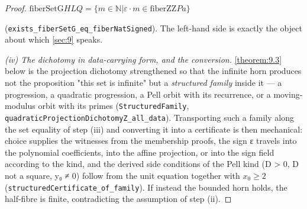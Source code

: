 \documentclass[11pt]{article}
\theoremstyle{plain}
\theoremstyle{definition}
\theoremstyle{remark}
\theoremstyle{plain}
\theoremstyle{definition}
\theoremstyle{remark}
\theoremstyle{plain}
\theoremstyle{definition}
\theoremstyle{remark}
\begin{document}
\begin{proof}
$\mathrm{fiberSetG} H L Q = \{m ∈ ℕ | ε·m ∈ \mathrm{fiberZZ} P a\}$

(\texttt{exists\_\allowbreak{}fiberSetG\_\allowbreak{}eq\_\allowbreak{}fiberNatSigned}). The left-hand side is exactly the object about which \cref{sec:9} speaks.

\emph{(iv) The dichotomy in data-carrying form, and the conversion.} \cref{theorem:9.3} below is the projection dichotomy strengthened so that the infinite horn produces not the proposition "this set is infinite" but a \emph{structured family} inside it — a progression, a quadratic progression, a Pell orbit with its recurrence, or a moving-modulus orbit with its primes (\texttt{StructuredFamily}, \texttt{quadraticProjectionDichotomyZ\_\allowbreak{}all\_\allowbreak{}data}). Transporting such a family along the set equality of step (iii) and converting it into a certificate is then mechanical: choice supplies the witnesses from the membership proofs, the sign ε travels into the polynomial coefficients, into the affine projection, or into the sign field according to the kind, and the derived side conditions of the Pell kind (D > 0, D not a square, y₀ ≠ 0) follow from the unit equation together with $x_{0} ≥ 2$ (\texttt{structuredCertificate\_\allowbreak{}of\_\allowbreak{}family}). If instead the bounded horn holds, the half-fibre is finite, contradicting the assumption of step (ii).

\end{proof}
\end{document}
